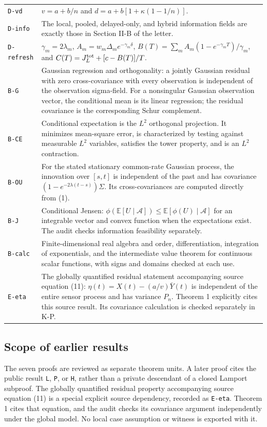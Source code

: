 \documentclass[11pt,letterpaper]{article}
\newcommand{\E}{\mathbb E}
\begin{document}
{\begin{longtable}{>{\raggedright\arraybackslash}p{.11\linewidth}>{\raggedright\arraybackslash}p{.79\linewidth}}
\texttt{D-vd} & $v=a+b/n$ and $d=a+b[1+\kappa(1-1/n)]$. \\[3pt]
\texttt{D-info} & The local, pooled, delayed-only, and hybrid information fields are exactly those in Section II-B of the letter. \\[3pt]
\texttt{D-refresh} & $\gamma_m=2\lambda_m$, $A_m=w_m\Delta_m e^{-\gamma_m\delta}$, $B(T)=\sum_m A_m(1-e^{-\gamma_mT})/\gamma_m$, and $C(T)=J_L^{\rm tot}+[c-B(T)]/T$. \\[3pt]
\texttt{B-G} & Gaussian regression and orthogonality: a jointly Gaussian residual with zero cross-covariance with every observation is independent of the observation sigma-field. For a nonsingular Gaussian observation vector, the conditional mean is its linear regression; the residual covariance is the corresponding Schur complement. \\[3pt]
\texttt{B-CE} & Conditional expectation is the $L^2$ orthogonal projection. It minimizes mean-square error, is characterized by testing against measurable $L^2$ variables, satisfies the tower property, and is an $L^2$ contraction. \\[3pt]
\texttt{B-OU} & For the stated stationary common-rate Gaussian process, the innovation over $[s,t]$ is independent of the past and has covariance $(1-e^{-2\lambda(t-s)})\Sigma$. Its cross-covariances are computed directly from (1). \\[3pt]
\texttt{B-J} & Conditional Jensen: $\phi(\E[U\mid\mathcal A])\le\E[\phi(U)\mid\mathcal A]$ for an integrable vector and convex function when the expectations exist. The audit checks information feasibility separately. \\[3pt]
\texttt{B-calc} & Finite-dimensional real algebra and order, differentiation, integration of exponentials, and the intermediate value theorem for continuous scalar functions, with signs and domains checked at each use. \\*[3pt]
\texttt{E-eta} & The globally quantified residual statement accompanying source equation (11): $\eta(t)=X(t)-(a/v)\bar Y(t)$ is independent of the entire sensor process and has variance $P_n$. Theorem 1 explicitly cites this source result. Its covariance calculation is checked separately in K-P. \\[3pt]
\end{longtable}}

\subsection{Scope of earlier results}
The seven proofs are reviewed as separate theorem units. A later proof cites the public result \texttt{L}, \texttt{P}, or \texttt{H}, rather than a private descendant of a closed Lamport subproof. The globally quantified residual property accompanying source equation (11) is a special explicit source dependency, recorded as \texttt{E-eta}. Theorem 1 cites that equation, and the audit checks its covariance argument independently under the global model. No local case assumption or witness is exported with it.
\end{document}
